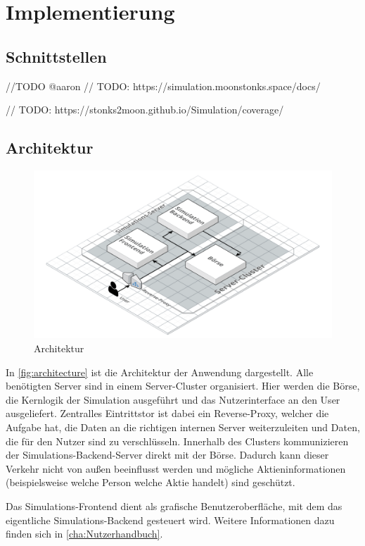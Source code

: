 \chapter{Implementierung}

\section{Schnittstellen}
//TODO @aaron
// TODO: https://simulation.moonstonks.space/docs/

// TODO: https://stonks2moon.github.io/Simulation/coverage/

\section{Architektur}\label{sec:Architektur}
\begin{figure}[ht]
    \includegraphics[width=\textwidth]{img/architecture.png}
    \centering
    \caption{Architektur}
    \label{fig:architecture}
\end{figure}

In \autoref{fig:architecture} ist die Architektur der Anwendung dargestellt.
Alle benötigten Server sind in einem Server-Cluster organisiert.
Hier werden die Börse, die Kernlogik der Simulation ausgeführt und das Nutzerinterface an den User ausgeliefert. Zentralles Eintrittstor ist dabei ein Reverse-Proxy, welcher die Aufgabe hat, die Daten an die richtigen internen Server weiterzuleiten und Daten, die für den Nutzer sind zu verschlüsseln.
Innerhalb des Clusters kommunizieren der Simulations-Backend-Server direkt mit der Börse. Dadurch kann dieser Verkehr nicht von außen beeinflusst werden und mögliche Aktieninformationen (beispielsweise welche Person welche Aktie handelt) sind geschützt.

Das Simulations-Frontend dient als grafische Benutzeroberfläche, mit dem das eigentliche Simulations-Backend gesteuert wird. Weitere Informationen dazu finden sich in \autoref{cha:Nutzerhandbuch}.

